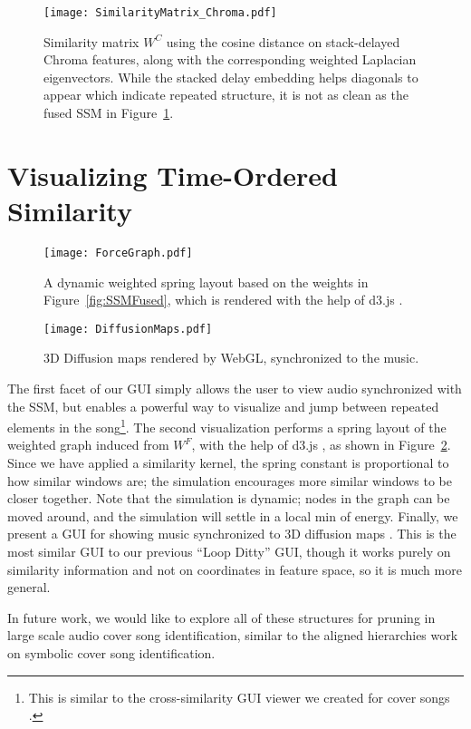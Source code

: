 \documentclass{article}
\begin{document}
\begin{figure}
    \centering
    \texttt{[image: SimilarityMatrix\_Chroma.pdf]}
    \caption{Similarity matrix $W^C$ using the cosine distance on stack-delayed Chroma features, along with the corresponding weighted Laplacian eigenvectors.  While the stacked delay embedding helps diagonals to appear which indicate repeated structure, it is not as clean as the fused SSM in Figure~\ref{fig:SSMChroma}.}
    \label{fig:SSMChroma}
\end{figure}
   



\section{Visualizing Time-Ordered Similarity}

\begin{figure}
    \texttt{[image: ForceGraph.pdf]}
    \caption{A dynamic weighted spring layout based on the weights in Figure~\ref{fig:SSMFused}, which is rendered with the help of d3.js \cite{bostock2012d3}.}
    \label{fig:ForceGraph}
\end{figure}
   
   
   
\begin{figure}
    \centering
    \texttt{[image: DiffusionMaps.pdf]}
    \caption{3D Diffusion maps rendered by WebGL, synchronized to the music.}
    \label{fig:DiffusionMaps}
\end{figure}

The first facet of our GUI simply allows the user to view audio synchronized with the SSM, but enables a powerful way to visualize and jump between repeated elements in the song\footnote{This is similar to the cross-similarity GUI viewer we created for cover songs \cite{tralie2017cover}.}.  The second visualization performs a spring layout of the weighted graph induced from $W^F$, with the help of d3.js \cite{bostock2012d3}, as shown in Figure~\ref{fig:ForceGraph}.  Since we have applied a similarity kernel, the spring constant is proportional to how similar windows are; the simulation encourages more similar windows to be closer together.  Note that the simulation is dynamic; nodes in the graph can be moved around, and the simulation will settle in a local min of energy. Finally, we present a GUI for showing music synchronized to 3D diffusion maps \cite{coifman2006diffusion}.  This is the most similar GUI to our previous ``Loop Ditty'' GUI\cite{tralie2017Dissertation}, though it works purely on similarity information and not on coordinates in feature space, so it is much more general.


In future work, we would like to explore all of these structures for pruning in large scale audio cover song identification, similar to the aligned hierarchies work \cite{kinnaird2016aligned} on symbolic cover song identification.


\small

\end{document}
